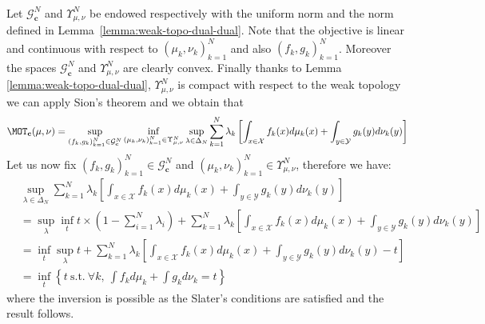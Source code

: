 \begin{prv*}
\begin{align*}
\end{align*}
Let $\mathcal{G}^{N}_{\mathbf{c}}$ and $\Upsilon_{\mu,\nu}^N$ be endowed respectively with the uniform norm and the norm defined in Lemma~\ref{lemma:weak-topo-dual-dual}. Note that the objective is linear and continuous with respect to $(\mu_k,\nu_k)_{k=1}^N$ and also $(f_k,g_k)_{k=1}^N$. Moreover the spaces $\mathcal{G}^{N}_{\mathbf{c}}$ and $\Upsilon_{\mu,\nu}^N$ are clearly convex. Finally thanks to Lemma \ref{lemma:weak-topo-dual-dual}, $\Upsilon_{\mu,\nu}^N$ is compact with respect to the weak topology we can apply Sion's theorem \cite{sion1958} and we obtain that
\begin{align*}
\MOT_{\mathbf{c}}(\mu,\nu)
 = \sup\limits_{(f_k,g_k)_{k=1}^N\in  \mathcal{G}^{N}_{\mathbf{c}}} \inf_{(\mu_k,\nu_k)_{k=1}^N\in\Upsilon_{\mu,\nu}^N }\sup_{\lambda\in \Delta_N}  \sum_{k=1}^N \lambda_k \left[\int_{x\in\mathcal{X}} f_k(x)d\mu_k(x)+ \int_{y\in\mathcal{Y}} g_k(y)d\nu_k(y)\right]
\end{align*}
Let us now fix $(f_k,g_k)_{k=1}^N\in  \mathcal{G}^{N}_{\mathbf{c}}$ and $(\mu_k,\nu_k)_{k=1}^N\in\Upsilon_{\mu,\nu}^N$, therefore we have:
\begin{align*}
    &\sup_{\lambda\in \Delta_N}  \sum_{k=1}^N \lambda_k \left[\int_{x\in\mathcal{X}} f_k(x)d\mu_k(x)+ \int_{y\in\mathcal{Y}} g_k(y)d\nu_k(y)\right] \\
    &=\sup_{\lambda}\inf_{t}  t\times\left(1-\sum_{i=1}^N \lambda_i \right) + \sum_{k=1}^N \lambda_k \left[\int_{x\in\mathcal{X}} f_k(x)d\mu_k(x)+ \int_{y\in\mathcal{Y}} g_k(y)d\nu_k(y)\right]\\
     &=\inf_{t} \sup_{\lambda} t + \sum_{k=1}^N \lambda_k \left[\int_{x\in\mathcal{X}} f_k(x)d\mu_k(x)+ \int_{y\in\mathcal{Y}} g_k(y)d\nu_k(y)- t\right]\\
     &= \inf_{t} \left\{t~\mathrm{ s.t.}~\forall k, ~ \int f_kd\mu_k+ \int g_kd\nu_k = t \right\}
\end{align*}
where the inversion is possible as the Slater's conditions are satisfied  and the result follows.
\end{prv*}




